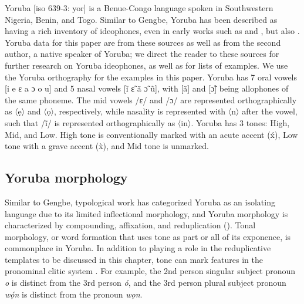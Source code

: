 \documentclass[output=paper,colorlinks,citecolor=brown]{langscibook}
\begin{document}
Yoruba [iso 639-3: yor] is a Benue-Congo language spoken in Southwestern Nigeria, Benin, and Togo. Similar to Gengbe, Yoruba has been described as having a rich inventory of ideophones, even in early works such as \citet{Awoyale1978, Awoyale1981, Awoyale1989} and \citet{Rowlands1970}, but also \citet{Akanbi2014}. Yoruba data for this paper are from these sources as well as from the second author, a native speaker of Yoruba; we direct the reader to these sources for further research on Yoruba ideophones, as well as for lists of examples. We use the Yoruba orthography for the examples in this paper. Yoruba has 7 oral vowels [i e ɛ a ɔ o u] and 5 nasal vowels [ĩ ɛ̃ ã ɔ̃ ũ], with [ã] and [ɔ̃] being allophones of the same phoneme. The mid vowels /ɛ/ and /ɔ/ are represented orthographically as 〈ẹ〉 and 〈ọ〉, respectively, while nasality is represented with 〈n〉 after the vowel, such that /ĩ/ is represented orthographically as 〈in〉. Yoruba has 3 tones: High, Mid, and Low. High tone is conventionally marked with an acute accent (x́), Low tone with a grave accent (x̀), and Mid tone is unmarked. 

\subsection{Yoruba morphology}

Similar to Gengbe, typological work has categorized Yoruba as an isolating language due to its limited inflectional morphology, and Yoruba morphology is characterized by compounding, affixation, and reduplication (\citealt{Adewole1995, PulleyblankandAkinlabi1988, Schleicher1987}). Tonal morphology, or word formation that uses tone as part or all of its exponence, is commonplace in Yoruba. In addition to playing a role in the reduplicative templates to be discussed in this chapter, tone can mark features in the pronominal clitic system \citep{AkinlabiandLeiberman2001}. For example, the 2nd person singular subject pronoun \textit{o} is distinct from the 3rd person \textit{ó}, and the 3rd person plural subject pronoun \textit{wọ́n} is distinct from the pronoun \textit{wọn}. 
\end{document}
